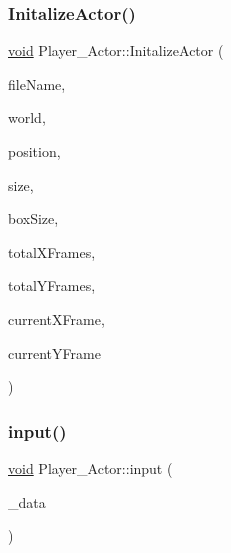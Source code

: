 \mbox{\label{classPlayer__Actor_a9bac2f7e839d7bb548f1cb06a27a4652}} 
\subsubsection{\texorpdfstring{Initalize\+Actor()}{InitalizeActor()}}
{\footnotesize\ttfamily \hyperlink{imgui__impl__opengl3__loader_8h_ac668e7cffd9e2e9cfee428b9b2f34fa7}{void} Player\+\_\+\+Actor\+::\+Initalize\+Actor (\begin{DoxyParamCaption}\item[{const char $\ast$}]{file\+Name,  }\item[{b2\+World $\ast$}]{world,  }\item[{glm\+::vec2}]{position,  }\item[{glm\+::vec2}]{size,  }\item[{glm\+::vec2}]{box\+Size,  }\item[{int}]{total\+X\+Frames,  }\item[{int}]{total\+Y\+Frames,  }\item[{int}]{current\+X\+Frame,  }\item[{int}]{current\+Y\+Frame }\end{DoxyParamCaption})}

\mbox{\label{classPlayer__Actor_a895c8c3db6763ad42d4c518987e2e543}} 
\subsubsection{\texorpdfstring{input()}{input()}}
{\footnotesize\ttfamily \hyperlink{imgui__impl__opengl3__loader_8h_ac668e7cffd9e2e9cfee428b9b2f34fa7}{void} Player\+\_\+\+Actor\+::input (\begin{DoxyParamCaption}\item[{\hyperlink{structGameData}{Game\+Data} $\ast$}]{\+\_\+data }\end{DoxyParamCaption})}

\mbox{\label{classPlayer__Actor_a7e08ea67f40c62b7db50d96a74c54be8}} 

